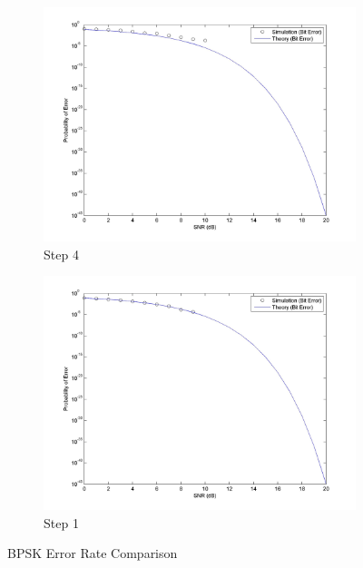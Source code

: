 \documentclass[]{article}
\begin{document}
\begin{figure}[h]
        \centering
        \begin{subfigure}[b]{0.6\textwidth}
                \includegraphics[width=\textwidth]{bpSNR.jpg}
                \caption{Step 4}
                \label{fig:bpSNR}
        \end{subfigure}%
        \qquad \quad %
        \begin{subfigure}[b]{0.6\textwidth}
                \includegraphics[width=\textwidth]{bpSNRstep1.jpg}
                \caption{Step 1}
                \label{fig:bpSNR1}
        \end{subfigure}
        \caption{BPSK Error Rate Comparison }
\end{figure}
\end{document}
